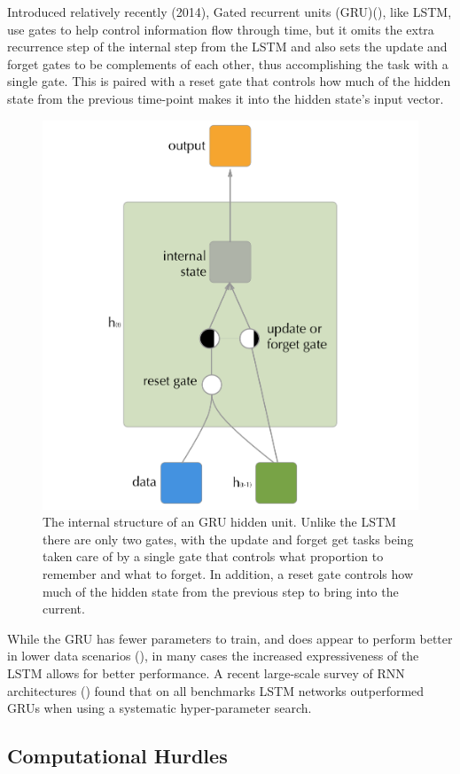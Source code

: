 \documentclass[]{book}
\theoremstyle{definition}
\theoremstyle{definition}
\theoremstyle{definition}
\theoremstyle{remark}
\begin{document}
Introduced relatively recently (2014), Gated recurrent units
(GRU)(\citet{gru_intro}), like LSTM, use gates to help control
information flow through time, but it omits the extra recurrence step of
the internal step from the LSTM and also sets the update and forget
gates to be complements of each other, thus accomplishing the task with
a single gate. This is paired with a reset gate that controls how much
of the hidden state from the previous time-point makes it into the
hidden state's input vector.

\begin{figure}

{\centering \includegraphics[width=0.6\linewidth]{figures/gru_cell} 

}

\caption{The internal structure of an GRU hidden unit. Unlike the LSTM there are only two gates, with the update and forget get tasks being taken care of by a single gate that controls what proportion to remember and what to forget. In addition, a reset gate controls how much of the hidden state from the previous step to bring into the current.}\label{fig:grudiagram}
\end{figure}

While the GRU has fewer parameters to train, and does appear to perform
better in lower data scenarios (\citet{graves_rnn}), in many cases the
increased expressiveness of the LSTM allows for better performance. A
recent large-scale survey of RNN architectures (\citet{rnn_survey})
found that on all benchmarks LSTM networks outperformed GRUs when using
a systematic hyper-parameter search.

\subsection{Computational Hurdles}\label{computational-hurdles}
\end{document}
